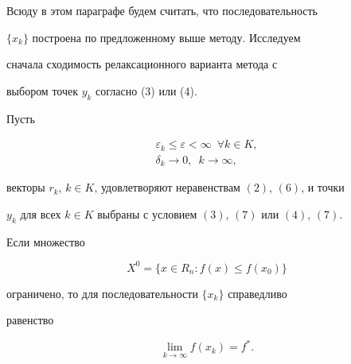 Всюду в этом параграфе будем считать, что последовательность


$\{x_k\} $ построена по предложенному выше методу. Исследуем


сначала сходимость релаксационного варианта метода с 


выбором точек $y_k$ согласно (3) или (4).





\begin{thm}


Пусть 


\begin{gather}


\varepsilon_k\leq \varepsilon <\infty \ \; \forall k\in K, \\


\delta_k\to 0,\ \; k\to \infty,


\end{gather}


векторы $r_k$, $k\in K$, удовлетворяют неравенствам $(2)$, $(6)$, и точки


$y_k$ для всех $k\in K$ выбраны с условием $(3)$, $(7)$ или $(4)$, $(7)$.


Если множество


$$


X^0=\{x\in R_n:f(x)\leq f(x_0)\}


$$


ограничено, то для последовательности $\{x_k\}$ справедливо


равенство


\begin{equation}


\lim_{k\to \infty }f(x_k)=f^*.


\end{equation}


\end{thm}






